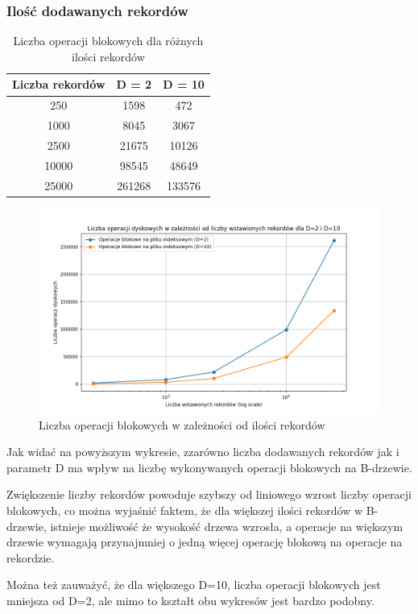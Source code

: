 \documentclass[12pt]{article}
\begin{document}
\subsubsection{Ilość dodawanych rekordów}
\begin{table}[H]
\centering
\caption{Liczba operacji blokowych dla różnych ilości rekordów}
\begin{tabular}{|c|c|c|}
\hline
Liczba rekordów & D = 2 & D = 10 \\
\hline
250 & 1598 & 472 \\
1000 & 8045 & 3067 \\
2500 & 21675 & 10126 \\
10000 & 98545 & 48649 \\
25000 & 261268 & 133576 \\
\hline
\end{tabular}
\end{table}

\begin{figure}[H]
    \centering
    \includegraphics[width=\textwidth]{../Plots/disk_operations_by_record_count.png}
    \caption{Liczba operacji blokowych w zależności od ilości rekordów}
    \label{fig:plot3}
\end{figure}

Jak widać na powyższym wykresie, zzarówno liczba dodawanych rekordów jak i parametr D ma wpływ 
na liczbę wykonywanych operacji blokowych na B-drzewie. 

Zwiększenie liczby rekordów powoduje szybszy od liniowego wzrost liczby operacji blokowych,
co można wyjaśnić faktem, że dla większej ilości rekordów w B-drzewie,
istnieje możliwość że wysokość drzewa wzrosła, a operacje na większym drzewie
wymagają przynajmniej o jedną więcej operację blokową na operacje na rekordzie.

Można też zauważyć, że dla większego D=10, liczba operacji blokowych jest mniejsza od D=2,
ale mimo to kształt obu wykresów jest bardzo podobny.
\end{document}
